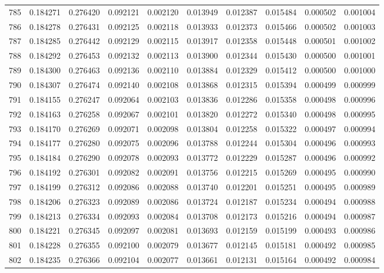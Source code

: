 \begin{tabular}{lrrrrrrrrr}
785 & 0.184271 & 0.276420 & 0.092121 & 0.002120 & 0.013949 & 0.012387 & 0.015484 & 0.000502 & 0.001004 \\
786 & 0.184278 & 0.276431 & 0.092125 & 0.002118 & 0.013933 & 0.012373 & 0.015466 & 0.000502 & 0.001003 \\
787 & 0.184285 & 0.276442 & 0.092129 & 0.002115 & 0.013917 & 0.012358 & 0.015448 & 0.000501 & 0.001002 \\
788 & 0.184292 & 0.276453 & 0.092132 & 0.002113 & 0.013900 & 0.012344 & 0.015430 & 0.000500 & 0.001001 \\
789 & 0.184300 & 0.276463 & 0.092136 & 0.002110 & 0.013884 & 0.012329 & 0.015412 & 0.000500 & 0.001000 \\
790 & 0.184307 & 0.276474 & 0.092140 & 0.002108 & 0.013868 & 0.012315 & 0.015394 & 0.000499 & 0.000999 \\
791 & 0.184155 & 0.276247 & 0.092064 & 0.002103 & 0.013836 & 0.012286 & 0.015358 & 0.000498 & 0.000996 \\
792 & 0.184163 & 0.276258 & 0.092067 & 0.002101 & 0.013820 & 0.012272 & 0.015340 & 0.000498 & 0.000995 \\
793 & 0.184170 & 0.276269 & 0.092071 & 0.002098 & 0.013804 & 0.012258 & 0.015322 & 0.000497 & 0.000994 \\
794 & 0.184177 & 0.276280 & 0.092075 & 0.002096 & 0.013788 & 0.012244 & 0.015304 & 0.000496 & 0.000993 \\
795 & 0.184184 & 0.276290 & 0.092078 & 0.002093 & 0.013772 & 0.012229 & 0.015287 & 0.000496 & 0.000992 \\
796 & 0.184192 & 0.276301 & 0.092082 & 0.002091 & 0.013756 & 0.012215 & 0.015269 & 0.000495 & 0.000990 \\
797 & 0.184199 & 0.276312 & 0.092086 & 0.002088 & 0.013740 & 0.012201 & 0.015251 & 0.000495 & 0.000989 \\
798 & 0.184206 & 0.276323 & 0.092089 & 0.002086 & 0.013724 & 0.012187 & 0.015234 & 0.000494 & 0.000988 \\
799 & 0.184213 & 0.276334 & 0.092093 & 0.002084 & 0.013708 & 0.012173 & 0.015216 & 0.000494 & 0.000987 \\
800 & 0.184221 & 0.276345 & 0.092097 & 0.002081 & 0.013693 & 0.012159 & 0.015199 & 0.000493 & 0.000986 \\
801 & 0.184228 & 0.276355 & 0.092100 & 0.002079 & 0.013677 & 0.012145 & 0.015181 & 0.000492 & 0.000985 \\
802 & 0.184235 & 0.276366 & 0.092104 & 0.002077 & 0.013661 & 0.012131 & 0.015164 & 0.000492 & 0.000984 \\

\end{tabular}
